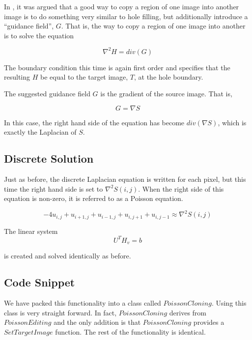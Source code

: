 \documentclass{InsightArticle}
\begin{document}
In \cite{PoissonImageEditing}, it was argued that a good way to copy a region of one image into another image is to do something very similar to hole filling, but additionally introduce a ``guidance field'', $G$. That is, the way to copy a region of one image into another is to solve the equation

\begin{equation}
\nabla^2 H = div(G)
\end{equation}

The boundary condition this time is again first order and specifies that the resulting $H$ be equal to the target image, $T$, at the hole boundary.

The suggested guidance field $G$ is the gradient of the source image. That is,

\begin{equation}
G = \nabla S
\end{equation}

In this case, the right hand side of the equation has become $div(\nabla S)$, which is exactly the Laplacian of $S$.

\subsection{Discrete Solution}
Just as before, the discrete Laplacian equation is written for each pixel, but this time the right hand side is set to $\nabla^2 S(i,j)$. When the right side of this equation is non-zero, it is referred to as a Poisson equation.

\begin{equation}
\label{eqn:DiscretePoisson}
-4 u_{i,j} + u_{i+1,j} + u_{i-1,j} + u_{i,j+1} + u_{i,j-1} \approx \nabla^2 S(i,j)
\end{equation}

The linear system 
\begin{equation}
 U^T H_v = b
\end{equation}

is created and solved identically as before.

\subsection{Code Snippet}
We have packed this functionality into a class called $PoissonCloning$. Using this class is very straight forward. In fact, $PoissonCloning$ derives from $PoissonEditing$ and the only addition is that $PoissonCloning$ provides a $SetTargetImage$ function. The rest of the functionality is identical.
\end{document}
